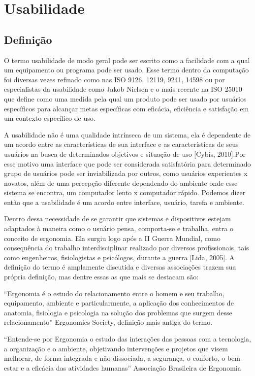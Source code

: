 \chapter{Usabilidade}

\section{Definição}
O termo usabilidade de modo geral pode ser escrito como a facilidade com a qual um equipamento ou programa pode ser usado. Esse termo dentro da computação foi diversas vezes refinado como nas ISO 9126, 12119, 9241, 14598 ou por especialistas da usabilidade como Jakob Nielsen e o mais recente na ISO 25010 que define como uma medida pela qual um produto pode ser usado por usuários específicos para alcançar metas específicas com eficácia, eficiência e satisfação em um contexto específico de uso.

A usabilidade não é uma qualidade intrínseca de um sistema, ela é dependente de um acordo entre as características de sua interface e as características de seus usuários na busca de determinados objetivos e situação de uso [Cybis, 2010].Por esse motivo uma interface que pode ser considerada satisfatória para determinado grupo de usuários pode ser inviabilizada por outros, como usuários experientes x novatos, além de uma percepção diferente dependendo do ambiente onde esse sistema se encontra, um computador lento x computador rápido. Podemos dizer então que a usabilidade é um acordo entre interface, usuário, tarefa e ambiente.

Dentro dessa necessidade de se garantir que sistemas e dispositivos estejam adaptados à maneira como o usuário pensa, comporta-se e trabalha, entra o conceito de ergonomia. Ela surgiu logo após a II Guerra Mundial, como consequência do trabalho interdisciplinar realizado por diversos profissionais, tais como engenheiros, fisiologistas e psicólogos, durante a guerra [Lida, 2005]. A definição do termo é amplamente discutida e diversas associações trazem sua própria definição, mas dentre essas as que mais se destacam são:

“Ergonomia é o estudo do relacionamento entre o homem e seu trabalho, equipamento, ambiente e particularmente, a aplicação dos conhecimentos de anatomia, fisiologia e psicologia na solução dos problemas que surgem desse relacionamento” 
Ergonomics Society, definição mais antiga do termo.

“Entende-se por Ergonomia o estudo das interações das pessoas com a tecnologia, a organização e o ambiente, objetivando intervenções e projetos que visem melhorar, de forma integrada e não-dissociada, a segurança, o conforto, o bem-estar e a eficácia das atividades humanas”
Associação Brasileira de Ergonomia

